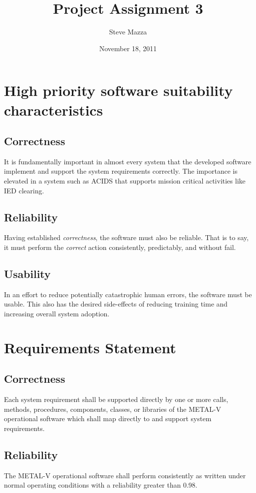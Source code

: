 \documentclass[letterpaper,10pt]{article}
\title{Project Assignment 3}
\author{Steve Mazza}
\date{November 18, 2011}
\begin{document}
\maketitle

\section{High priority software suitability characteristics}
\subsection{Correctness}
It is fundamentally important in almost every system that the developed software implement and support the system requirements correctly.  The importance is elevated in a system such as ACIDS that supports mission critical activities like IED clearing.
\subsection{Reliability}
Having established \emph{correctness}, the software must also be reliable.  That is to say, it must perform the \emph{correct} action consistently, predictably, and without fail.
\subsection{Usability}
In an effort to reduce potentially catastrophic human errors, the software must be usable.  This also has the desired side-effects of reducing training time and increasing overall system adoption.

\section{Requirements Statement}
\subsection{Correctness}
Each system requirement shall be supported directly by one or more calls, methods, procedures, components, classes, or libraries of the METAL-V operational software which shall map directly to and support system requirements.
\subsection{Reliability}
The METAL-V operational software shall perform consistently as written under normal operating conditions with a reliability greater than 0.98.
\end{document}
